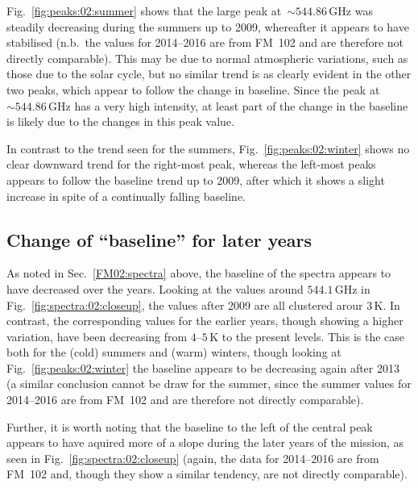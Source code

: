 \noindent
Fig.~\ref{fig:peaks:02:summer} shows that the large  peak
at~$\sim544.86\,\mathrm{GHz}$ was steadily decreasing during the summers up to
2009, whereafter it appears to have stabilised (n.b.~the values for 2014--2016
are from FM~102 and are therefore not directly comparable).  This may be due to
normal atmospheric variations, such as those due to the solar cycle, but no
similar trend is as clearly evident in the other two peaks, which appear to
follow the change in baseline.  Since the peak at~$\sim544.86\,\mathrm{GHz}$
has a very high intensity, at least part of the change in the baseline is
likely due to the changes in this peak value.

In contrast to the trend seen for the summers, Fig.~\ref{fig:peaks:02:winter}
shows no clear downward trend for the right-most peak, whereas the left-most
 peaks appears to follow the baseline trend up to 2009, after which
it shows a slight increase in spite of a continually falling baseline.


\subsection{Change of ``baseline'' for later years}
\label{FM02:baseline}
As noted in Sec.~\ref{FM02:spectra} above, the baseline of the spectra appears
to have decreased over the years. Looking at the values around
$544.1\,\mathrm{GHz}$ in Fig.~\ref{fig:spectra:02:closeup}, the values after
2009 are all clustered arour $3\,\mathrm{K}$.  In contrast, the corresponding
values for the earlier years, though showing a higher variation, have been
decreasing from $4$--$5\,\mathrm{K}$ to the present levels.  This is the case
both for the (cold) summers and (warm) winters, though looking at
Fig.~\ref{fig:peaks:02:winter} the baseline appears to be decreasing again
after 2013 (a similar conclusion cannot be draw for the summer, since the
summer values for 2014--2016 are from FM~102 and are therefore not directly
comparable).

Further, it is worth noting that the baseline to the left of the central peak
appears to have aquired more of a slope during the later years of the mission,
as seen in Fig.~\ref{fig:spectra:02:closeup} (again, the data for 2014--2016
are from FM~102 and, though they show a similar tendency, are not directly
comparable).
